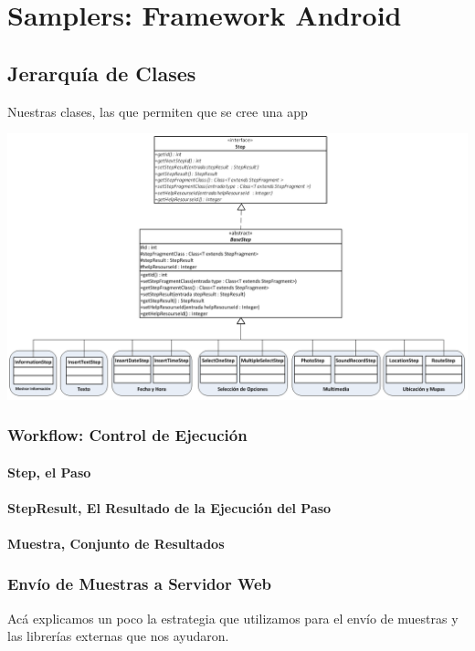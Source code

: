 \chapter{Samplers: Framework Android}




\section{Jerarquía de Clases}
Nuestras clases, las que permiten que se cree una app

\includegraphics[scale=0.4]{05-implementacion/Steps.png} 


\subsection{Workflow: Control de Ejecución}

\subsubsection{Step, el Paso}

\subsubsection{StepResult, El Resultado de la Ejecución del Paso}

\subsubsection{Muestra, Conjunto de Resultados}

\subsection{Envío de Muestras a Servidor Web}
Acá explicamos un poco la estrategia que utilizamos para el envío de muestras y las librerías externas que nos ayudaron.

